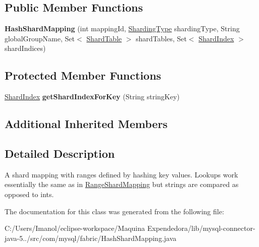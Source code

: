 \subsection*{Public Member Functions}
\begin{DoxyCompactItemize}
\item 
\mbox{\label{classcom_1_1mysql_1_1fabric_1_1_hash_shard_mapping_a73d9a7ab9427e6580ab98334cb68b24d}} 
{\bfseries Hash\+Shard\+Mapping} (int mapping\+Id, \mbox{\hyperlink{enumcom_1_1mysql_1_1fabric_1_1_sharding_type}{Sharding\+Type}} sharding\+Type, String global\+Group\+Name, Set$<$ \mbox{\hyperlink{classcom_1_1mysql_1_1fabric_1_1_shard_table}{Shard\+Table}} $>$ shard\+Tables, Set$<$ \mbox{\hyperlink{classcom_1_1mysql_1_1fabric_1_1_shard_index}{Shard\+Index}} $>$ shard\+Indices)
\end{DoxyCompactItemize}
\subsection*{Protected Member Functions}
\begin{DoxyCompactItemize}
\item 
\mbox{\label{classcom_1_1mysql_1_1fabric_1_1_hash_shard_mapping_a69affdd31f5856f9301be9df7c8d8933}} 
\mbox{\hyperlink{classcom_1_1mysql_1_1fabric_1_1_shard_index}{Shard\+Index}} {\bfseries get\+Shard\+Index\+For\+Key} (String string\+Key)
\end{DoxyCompactItemize}
\subsection*{Additional Inherited Members}


\subsection{Detailed Description}
A shard mapping with ranges defined by hashing key values. Lookups work essentially the same as in \mbox{\hyperlink{classcom_1_1mysql_1_1fabric_1_1_range_shard_mapping}{Range\+Shard\+Mapping}} but strings are compared as opposed to ints. 

The documentation for this class was generated from the following file\+:\begin{DoxyCompactItemize}
\item 
C\+:/\+Users/\+Imanol/eclipse-\/workspace/\+Maquina Expendedora/lib/mysql-\/connector-\/java-\/5../src/com/mysql/fabric/Hash\+Shard\+Mapping.\+java\end{DoxyCompactItemize}
